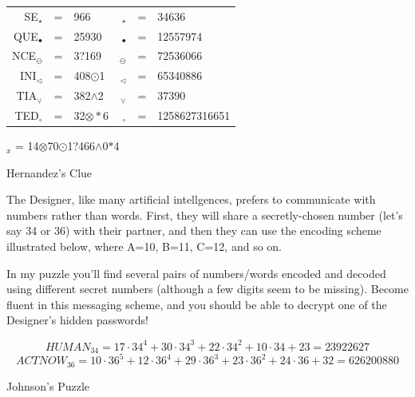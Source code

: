 \documentclass{article}
\begin{document}
\begin{center}\LARGE
\begin{tabular}{rclrcl}
 SE$_\star$ & =&966 & \hspace{3em}\underline{\hspace{3cm}}$_\star$ & =&34636 \\
 QUE$_\bullet$ & =&25930 & \underline{\hspace{3cm}}$_\bullet$ & =&12557974 \\
 NCE$_\ominus$ & =&3?169 & \underline{\hspace{3cm}}$_\ominus$ & =&72536066 \\
 INI$_\triangleleft$ & =&408$\odot$1 & \underline{\hspace{3cm}}$_\triangleleft$ & =&65340886 \\
 TIA$_\vee$ & =&382$\wedge$2 & \underline{\hspace{3cm}}$_\vee$ & =&37390 \\
 TED$_\circ$ & =&32$\otimes\ast$6 &  \underline{\hspace{3cm}}$_\circ$ & =&1258627316651 \\
\end{tabular}
\end{center}
\vspace*{1cm}
\begin{center}\LARGE
\underline{\hspace{4cm}}\(_x\) =
14\(\otimes\)70\(\odot\)1?466\(\wedge\)0\(\ast\)4
\end{center}

\newpage

Hernandez's Clue

The Designer, like many artificial intellgences,
prefers to communicate with numbers rather than words. First,
they will share a secretly-chosen number (let's say 34 or 36)
with their partner,
and then they can use the encoding scheme illustrated below, where
A=10, B=11, C=12, and so on.

In my puzzle you'll find several pairs of numbers/words
encoded and decoded using
different secret numbers (although a few digits seem
to be missing). Become fluent in this messaging
scheme, and you should be able to decrypt one of the Designer's
hidden passwords!

\[HUMAN_{34} =
17\cdot34^4+30\cdot34^3+
22\cdot34^2+10\cdot34+23 = 23922627\]
\[ACTNOW_{36} =
10\cdot36^5+12\cdot36^4+29\cdot36^3+
23\cdot36^2+24\cdot36+32 = 626200880\]

\newpage

Johnson's Puzzle
\end{document}
